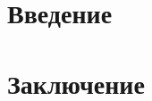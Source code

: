 \documentclass[a4paper,14pt,oneside,openany]{memoir}
\begin{document}
\maketitlepage %

\renewcommand{\contentsname}{Содержание}
\tableofcontents*
{}
\clearpage

\justifying
\chapter*{Введение}
\vspace{\baselineskip}











\chapter*{Заключение}
\vspace{\baselineskip}



\clearpage

\printbibliography

\appendix

\renewcommand*{\printchaptername}{\MakeUppercase{\appendixname}}
\renewcommand*{\afterchapternum}{\centering\par\nobreak\vskip \midchapskip}
\renewcommand*{\printchapternum}{\chapnumfont \thechapter}
\renewcommand\thechapter{\Asbuk{chapter}}
\renewcommand*{\printchaptertitle}[1]{\chaptitlefont #1}


\end{document}
